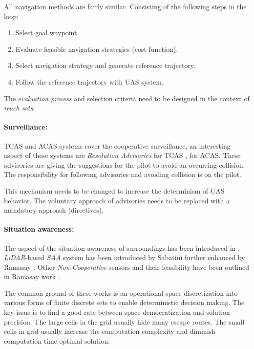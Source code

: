 All navigation methods are fairly similar. Consisting of the following steps in the loop:
\begin{enumerate}
    \item Select goal waypoint.
    \item Evaluate feasible navigation strategies (cost function).
    
    \item Select navigation strategy and generate reference trajectory.
    
    \item Follow the reference trajectory with UAS system.
\end{enumerate}
The \emph{evaluation process} and selection criteria need to be designed in the context of \emph{reach sets}.

\paragraph{Surveillance:} TCAS and ACAS systems cover the cooperative surveillance, an interesting aspect of these systems are \emph{Resolution Advisories} \cite{kennedy1995resolution} for TCAS \cite{marston2015acas}, for ACAS.  These advisories are giving the suggestions for the pilot to avoid an occurring collision. The responsibility for following advisories and avoiding collision is on the pilot.  

This mechanism needs to be changed to increase the determinism of UAS behavior. The voluntary approach of advisories needs to be replaced with a mandatory approach (directives).

\paragraph{Situation awareness:} The aspect of the situation awareness of surroundings has been introduced in \cite{blaskovich2007declutter}. \emph{LiDAR}-based \emph{SAA} system has been introduced by Sabatini \cite{sabatini2014lidar} further enhanced by Ramasay \cite{ramasamy2016lidar}. Other \emph{Non-Cooperative} sensors and their feasibility have been outlined in Ramasay work \cite{ramasamy2014avionics}. 

The common ground of these works is an operational space discretization into various forms of finite discrete sets to enable deterministic decision making. The key issue is to find a good rate between space democratization and solution precision. The large cells in the grid usually hide many escape routes. The small cells in grid usually increase the computation complexity and diminish computation time optimal solution.

